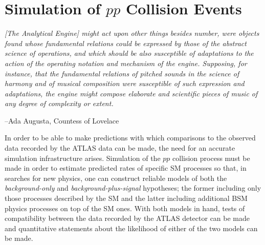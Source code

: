 \chapter{Simulation of $pp$ Collision Events}
\label{chap:simulation}

\epigraph{\textit{[The Analytical Engine] might act upon other things besides number, were objects found whose
fundamental relations could be expressed by those of the abstract science of operations, and which should be also susceptible
of adaptations to the action of the operating notation and mechanism of the engine. Supposing, for instance, that the
fundamental relations of pitched sounds in the science of harmony and of musical composition were susceptible of such
expression and adaptations, the engine might compose elaborate and scientific pieces of music of any degree of
complexity or extent.}}{--Ada Augusta, Countess of Lovelace}


In order to be able to make predictions with which comparisons to the observed data
recorded by the ATLAS data can be made, the need for an accurate simulation infrastructure
arises.
Simulation of the $pp$ collision process must be made in order to estimate predicted
rates of specific SM processes so that, in searches for new physics, one can
construct reliable models of both the \textit{background-only} and \textit{background-plus-signal}
hypotheses; the former including only those processes described by the SM and the latter
including additional BSM physics processes on top of the SM ones.
With both models in hand, tests of compatibility between the data recorded by the ATLAS detector
can be made and quantitative statements about the likelihood of either of the two models can be made.

